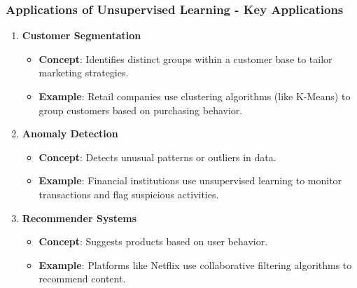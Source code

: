\documentclass[aspectratio=169]{beamer}
\begin{document}
\begin{frame}[fragile]
    \frametitle{Applications of Unsupervised Learning - Key Applications}
    \begin{enumerate}
        \item \textbf{Customer Segmentation}  
        \begin{itemize}
            \item \textbf{Concept}: Identifies distinct groups within a customer base to tailor marketing strategies.
            \item \textbf{Example}: Retail companies use clustering algorithms (like K-Means) to group customers based on purchasing behavior.
        \end{itemize}

        \item \textbf{Anomaly Detection}  
        \begin{itemize}
            \item \textbf{Concept}: Detects unusual patterns or outliers in data.
            \item \textbf{Example}: Financial institutions use unsupervised learning to monitor transactions and flag suspicious activities.
        \end{itemize}

        \item \textbf{Recommender Systems}  
        \begin{itemize}
            \item \textbf{Concept}: Suggests products based on user behavior.
            \item \textbf{Example}: Platforms like Netflix use collaborative filtering algorithms to recommend content.
        \end{itemize}
    \end{enumerate}
\end{frame}
\end{document}
